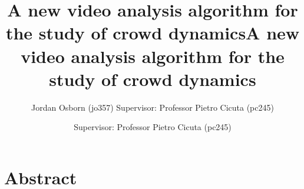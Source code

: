 \documentclass[11pt]{article}
\title{A new video analysis algorithm for the study of crowd dynamics}
\author{Jordan Osborn (jo357) Supervisor: Professor Pietro Cicuta (pc245)}
\begin{document}
\begin{titlingpage}
    \maketitle
\end{titlingpage}


\clearpage
\title{A new video analysis algorithm for the study of crowd dynamics}
\author{Supervisor: Professor Pietro Cicuta (pc245)}
\maketitle
\section*{Abstract}

\clearpage
\tableofcontents

\clearpage
\end{document}
